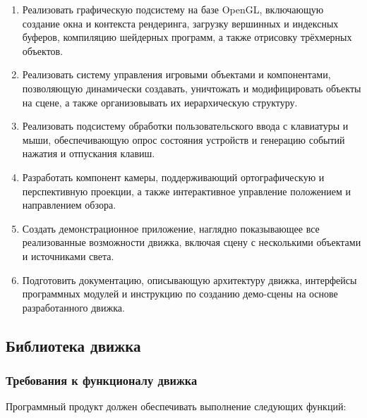 \begin{enumerate}	
	\item Реализовать графическую подсистему на базе OpenGL, включающую создание окна и контекста рендеринга, загрузку вершинных и индексных буферов, компиляцию шейдерных программ, а также отрисовку трёхмерных объектов.
	
	\item Реализовать систему управления игровыми объектами и компонентами, позволяющую динамически создавать, уничтожать и модифицировать объекты на сцене, а также организовывать их иерархическую структуру.
	
	\item Реализовать подсистему обработки пользовательского ввода с клавиатуры и мыши, обеспечивающую опрос состояния устройств и генерацию событий нажатия и отпускания клавиш.
	
	\item Разработать компонент камеры, поддерживающий ортографическую и перспективную проекции, а также интерактивное управление положением и направлением обзора.
	
	\item Создать демонстрационное приложение, наглядно показывающее все реализованные возможности движка, включая сцену с несколькими объектами и источниками света.
	
	\item Подготовить документацию, описывающую архитектуру движка, интерфейсы программных модулей и инструкцию по созданию демо-сцены на основе разработанного движка.
\end{enumerate}

\subsection{Библиотека движка}
\subsubsection{Требования к функционалу движка}

Программный продукт должен обеспечивать выполнение следующих функций:

